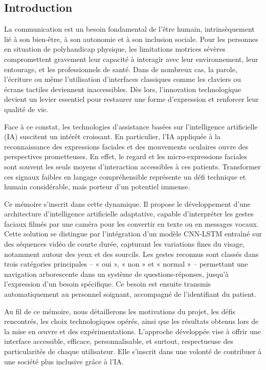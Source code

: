 \documentclass[
]{article}
\begin{document}
\hypertarget{introduction}{%
\subsection{Introduction}\label{introduction}}

La communication est un besoin fondamental de l'être humain, intrinsèquement lié à son bien-être, à son autonomie et à son inclusion sociale. Pour les personnes en situation de polyhandicap physique, les limitations motrices sévères compromettent gravement leur capacité à interagir avec leur environnement, leur entourage, et les professionnels de santé. Dans de nombreux cas, la parole, l'écriture ou même l'utilisation d'interfaces classiques comme les claviers ou écrans tactiles deviennent inaccessibles. Dès lors, l'innovation technologique devient un levier essentiel pour restaurer une forme d'expression et renforcer leur qualité de vie.

Face à ce constat, les technologies d'assistance basées sur l'intelligence artificielle (IA) suscitent un intérêt croissant. En particulier, l'IA appliquée à la reconnaissance des expressions faciales et des mouvements oculaires ouvre des perspectives prometteuses. En effet, le regard et les micro-expressions faciales sont souvent les seuls moyens d'interaction accessibles à ces patients. Transformer ces signaux faibles en langage compréhensible représente un défi technique et humain considérable, mais porteur d'un potentiel immense.

Ce mémoire s'inscrit dans cette dynamique. Il propose le développement d'une architecture d'intelligence artificielle adaptative, capable d'interpréter les gestes faciaux filmés par une caméra pour les convertir en texte ou en messages vocaux. Cette solution se distingue par l'intégration d'un modèle CNN-LSTM entraîné sur des séquences vidéo de courte durée, capturant les variations fines du visage, notamment autour des yeux et des sourcils. Les gestes reconnus sont classés dans trois catégories principales -- « oui », « non » et « normal » -- permettant une navigation arborescente dans un système de questions-réponses, jusqu'à l'expression d'un besoin spécifique. Ce besoin est ensuite transmis automatiquement au personnel soignant, accompagné de l'identifiant du patient.

Au fil de ce mémoire, nous détaillerons les motivations du projet, les défis rencontrés, les choix technologiques opérés, ainsi que les résultats obtenus lors de la mise en œuvre et des expérimentations. L'approche développée vise à offrir une interface accessible, efficace, personnalisable, et surtout, respectueuse des particularités de chaque utilisateur. Elle s'inscrit dans une volonté de contribuer à une société plus inclusive grâce à l'IA.
\end{document}
